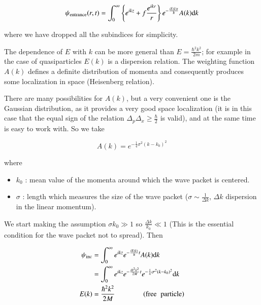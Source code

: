 \documentclass[a4paper,14pt]{book}
\begin{document}
\begin{equation}\label{eq2nd_1}
\psi_{\rm entrance}(r,t) = \int_0^{\infty} \left\{ e^{ikz} + f \frac{e^{ikr}}{r} \right\} e^{-\frac{i E(k) t}{\hbar}} A(k) {\rm d}k
\end{equation}

\noindent where we have dropped all the subindices for simplicity.

The dependence of $E$ with $k$ can be more general than $E=\frac{\hbar^2 k^2}{2m}$; for example in the case of quasiparticles $E(k)$ is a dispersion relation. The weighting function $A(k)$ defines a definite distribution of momenta and consequently produces some localization in space (Heisenberg relation).

There are many possibilities for $A(k)$, but a very convenient one is the Gaussian distribution, as it provides a very good space localization (it is in this case that the equal sign of the relation $\Delta_p \Delta_x \ge \frac{\hbar}{2}$ is valid), and at the same time is easy to work with. So we take

\begin{equation}
A(k) = e^{-\frac{1}{4} \sigma^2 (k-k_0)^2}
\end{equation}

\noindent where

\begin{itemize}
\item{$k_0$ : mean value of the momenta around which the wave packet is centered.}
\item{$\sigma$ : length which measures the size of the wave packet ($\sigma \sim \frac{1}{\Delta k}$, $\Delta k$ dispersion in the linear momentum).}
\end{itemize}

We start making the assumption $\sigma k_0 \gg 1$ so $\frac{\Delta k}{k_0} \ll 1$ (This is the essential condition for the wave packet not to spread). Then

\begin{equation}
\begin{split}
\psi_{\rm inc} &= \int_0^{\infty} e^{ikz} e^{-\frac{iE(k)}{\hbar}t} A(k) {\rm d}k \\
&= \int_0^{\infty} e^{ikz} e^{-\frac{i \hbar^2 k^2}{2M}t} e^{-\frac{1}{4}\sigma^2 (k-k_0)^2} {\rm d}k \\
E(k) &= \frac{\hbar^2 k^2}{2M} \qquad \qquad ({\rm free \;\; particle})
\end{split}
\end{equation}
\end{document}
